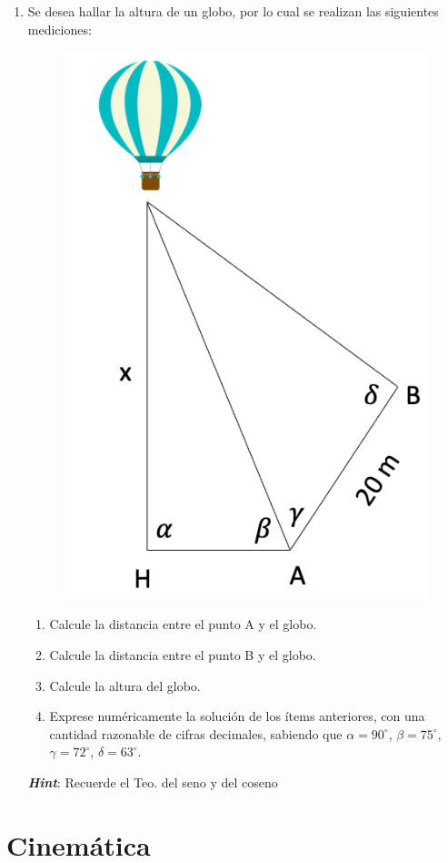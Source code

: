 \documentclass[letterpaper,11pt]{article}
\begin{document}
\begin{enumerate}
\item Se desea hallar la altura de un globo, por lo cual se realizan las siguientes mediciones:

\begin{multicols}{2}
    \begin{figure}[H]
        \centering
        \includegraphics[width=0.4\linewidth]{2021-2/img/ejercicios/imagen_ej1.jpg}
    \end{figure}
    \columnbreak
    \begin{enumerate}
        \item Calcule la distancia entre el punto A y el globo.
        
        \item Calcule la distancia entre el punto B y el globo.
        
        \item Calcule la altura del globo.
        
        \item Exprese numéricamente la solución de los ítems anteriores, con una cantidad razonable de cifras decimales, sabiendo que $\alpha=90^{\circ}$, $\beta=75^{\circ}$, $\gamma=72^{\circ}$, $\delta=63^{\circ}$.  %
    \end{enumerate}
    
    \textbf{\textit{Hint}}: Recuerde el Teo. del seno y del coseno
\end{multicols}

\end{enumerate}

\section*{Cinemática}
\end{document}
